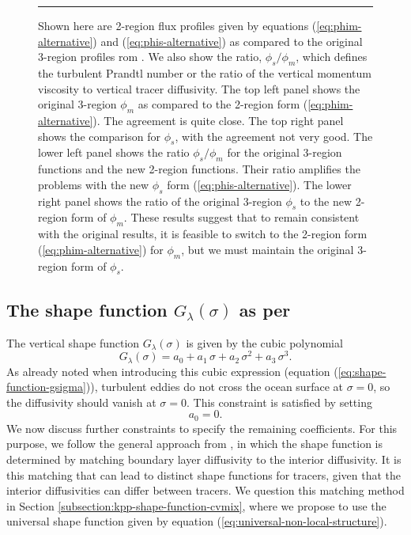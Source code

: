\begin{figure}[h!t]
\begin{center}
\caption[Alternative similarity functions]{\sf Shown here are 2-region
  flux profiles given by equations (\ref{eq:phim-alternative}) and
  (\ref{eq:phis-alternative}) as compared to the original 3-region
  profiles rom \cite{LargeKPP}.  We also show the ratio,
  $\phi_{s}/\phi_{m}$, which defines the turbulent Prandtl number or
  the ratio of the vertical momentum viscosity to vertical tracer
  diffusivity.  The top left panel shows the original 3-region
  $\phi_{m}$ as compared to the 2-region form
  (\ref{eq:phim-alternative}).  The agreement is quite close.  The top
  right panel shows the comparison for $\phi_{s}$, with the agreement
  not very good. The lower left panel shows the ratio
  $\phi_{s}/\phi_{m}$ for the original 3-region functions and the new
  2-region functions.  Their ratio amplifies the problems with the new
  $\phi_{s}$ form (\ref{eq:phis-alternative}).  The lower right panel
  shows the ratio of the original 3-region $\phi_{s}$ to the new
  2-region form of $\phi_{m}$.  These results suggest that to remain
  consistent with the original \cite{LargeKPP} results, it is feasible
  to switch to the 2-region form (\ref{eq:phim-alternative}) for
  $\phi_{m}$, but we must maintain the original 3-region form of
  $\phi_{s}$.}
\label{fig:phi-alternative-kpp}
\end{center}
\rule{\textwidth}{0.005in}
\end{figure}


\subsection{The shape function $G_{\lambda}(\sigma)$ as per \cite{LargeKPP}}
\label{subsection:kpp-shape-function}

The vertical shape function $G_{\lambda}(\sigma)$ is given by the cubic
polynomial 
\begin{equation}
 G_{\lambda}(\sigma) = a_{0} + a_{1} \, \sigma + a_{2} \, \sigma^{2} + a_{3} \, \sigma^{3}.
\label{eq:shape-function-gsigma-again}
\end{equation}
As already noted when introducing this cubic expression (equation
(\ref{eq:shape-function-gsigma})), turbulent eddies do not cross
the ocean surface at $\sigma=0$, so the diffusivity should vanish at
$\sigma=0$.  This constraint is satisfied by setting
\begin{equation}
 a_{0} = 0.
\end{equation}
We now discuss further constraints to specify the remaining
coefficients.  For this purpose, we follow the general approach from
\cite{LargeKPP}, in which the shape function is determined by matching
boundary layer diffusivity to the interior diffusivity.  It is this
matching that can lead to distinct shape functions for tracers, given
that the interior diffusivities can differ between tracers.  We
question this matching method in Section
\ref{subsection:kpp-shape-function-cvmix}, where we propose to use the
universal shape function given by equation
(\ref{eq:universal-non-local-structure}).



